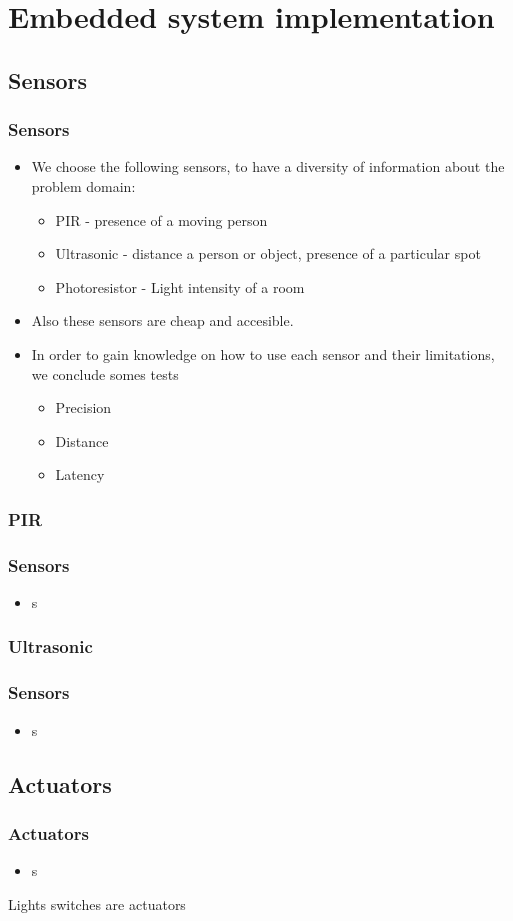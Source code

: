 \section{Embedded system implementation}
\subsection{Sensors}
\begin{frame}
	\frametitle{Sensors}
	\begin{itemize}
		\item We choose the following sensors, to have a diversity of information about the problem domain:
		\begin{itemize}
		  \item PIR - presence of a moving person
		  \item Ultrasonic - distance a person or object, presence of a particular spot
		  \item Photoresistor - Light intensity of a room
		\end{itemize}
		\item Also these sensors are cheap and accesible.
		\item In order to gain knowledge on how to use each sensor and their limitations, we conclude somes tests
		\begin{itemize}
		  \item Precision
		  \item Distance
		  \item Latency
		\end{itemize}
	\end{itemize}
\end{frame}
\subsubsection{PIR}
\begin{frame}
	\frametitle{Sensors}
	\begin{itemize}
    \item s
	\end{itemize}
\end{frame}
\subsubsection{Ultrasonic}
\begin{frame}
	\frametitle{Sensors}
	\begin{itemize}
    \item s
	\end{itemize}
\end{frame}
\subsection{Actuators}
\begin{frame}
	\frametitle{Actuators}
  \begin{itemize}
    \item s
	\end{itemize}
	Lights switches are actuators
\end{frame}
